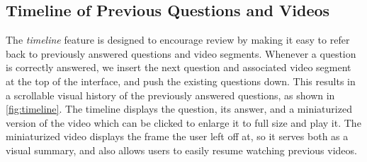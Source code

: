 \documentclass{sigchi}
\begin{document}



\subsection{Timeline of Previous Questions and Videos}

The \emph{timeline} feature is designed to encourage review by making it easy to refer back to previously answered questions and video segments. Whenever a question is correctly answered, we insert the next question and associated video segment at the top of the interface, and push the existing questions down. This results in a scrollable visual history of the previously answered questions, as shown in \autoref{fig:timeline}. The timeline displays the question, its answer, and a miniaturized version of the video which can be clicked to enlarge it to full size and play it. The miniaturized video displays the frame the user left off at, so it serves both as a visual summary, and also allows users to easily resume watching previous videos.%
\end{document}

